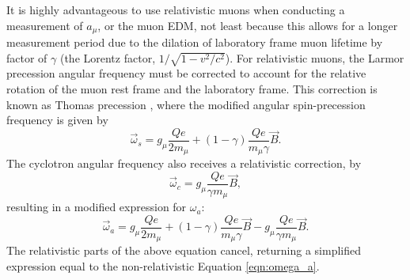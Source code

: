 It is highly advantageous to use relativistic muons when conducting a measurement of $a_{\mu}$, or the muon EDM, not least because this allows for a longer measurement period due to the dilation of laboratory frame muon lifetime by factor of $\gamma$ (the Lorentz factor, $1/\sqrt{1-v^{2}/c^{2}}$). For relativistic muons, the Larmor precession angular frequency must be corrected to account for the relative rotation of the muon rest frame and the laboratory frame. This correction is known as Thomas precession \cite{ThomasPrecession}, where the modified angular spin-precession frequency is given by
%
\begin{equation}
  \vec{\omega}_{s} = g_{\mu}\frac{Qe}{2m_{\mu}}+(1-\gamma)\frac{Qe}{m_{\mu}\gamma}\vec{B}.
  \label{eqn:ThomasPrecession}
\end{equation}
%
The cyclotron angular frequency also receives a relativistic correction, by
%
\begin{equation}
  \vec{\omega}_{c} = g_{\mu}\frac{Qe}{\gamma m_{\mu}}\vec{B},
  \label{eqn:RelativisticCycltron}
\end{equation}
%
resulting in a modified expression for $\omega_{a}$:
%
\begin{equation}
  \vec{\omega}_{a} = g_{\mu}\frac{Qe}{2m_{\mu}}+(1-\gamma)\frac{Qe}{m_{\mu}\gamma}\vec{B} - g_{\mu}\frac{Qe}{\gamma m_{\mu}}\vec{B}.
  \label{eqn:RelativisticOmegaA}
\end{equation}
%
The relativistic parts of the above equation cancel, returning a simplified expression equal to the non-relativistic Equation \ref{eqn:omega_a}. 

